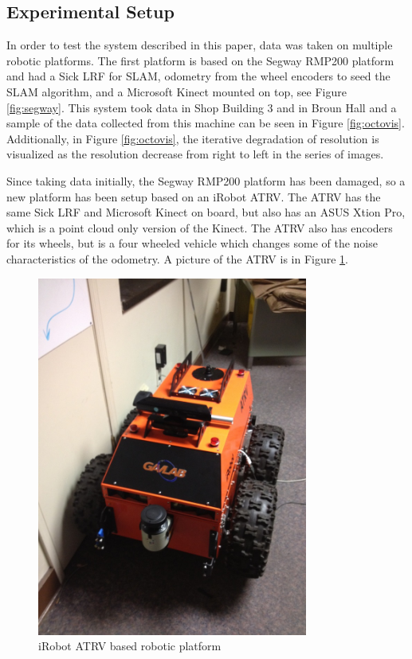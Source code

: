 \documentclass[journal]{IEEEtran}
\begin{document}
  \subsection{Experimental Setup}
  \label{sec:experimental_setup}
  In order to test the system described in this paper, data was taken on
  multiple robotic platforms. The first platform is based on the Segway RMP200
  platform and had a Sick LRF for SLAM, odometry from the wheel encoders to
  seed the SLAM algorithm, and a Microsoft Kinect mounted on top, see Figure
  \ref{fig:segway}. This system took data in Shop Building 3 and in Broun Hall
  and a sample of the data collected from this machine can be seen in Figure
  \ref{fig:octovis}. Additionally, in Figure \ref{fig:octovis}, the iterative
  degradation of resolution is visualized as the resolution decrease from
  right to left in the series of images.
  
  Since taking data initially, the Segway RMP200 platform has been damaged, so a new platform has been setup based on an iRobot ATRV.  The ATRV has the same Sick LRF and Microsoft Kinect on board, but also has an ASUS Xtion Pro, which is a point cloud only version of the Kinect.  The ATRV also has encoders for its wheels, but is a four wheeled vehicle which changes some of the noise characteristics of the odometry.  A picture of the ATRV is in Figure \ref{fig:atrv}.
  
  \begin{figure}[here]
    \centering
    \includegraphics[width=3.5in,keepaspectratio]{atrv.jpeg}
    \caption{iRobot ATRV based robotic platform}
    \label{fig:atrv}
  \end{figure}
  
\end{document}
